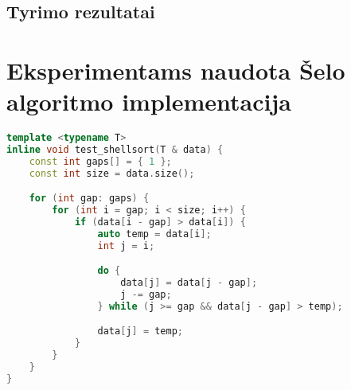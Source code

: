 \documentclass{VUMIFInfBakalaurinis}
\begin{document}
\subsection{Tyrimo rezultatai}




\printbibliography[heading=bibintoc]

\appendix  %

\section{Eksperimentams naudota Šelo algoritmo implementacija}

\begin{lstlisting}[label={alg:test_shellsort},language=C++]
template <typename T>
inline void test_shellsort(T & data) {
    const int gaps[] = { 1 };
    const int size = data.size();

    for (int gap: gaps) {
        for (int i = gap; i < size; i++) {
            if (data[i - gap] > data[i]) {
                auto temp = data[i];
                int j = i;

                do {
                    data[j] = data[j - gap];
                    j -= gap;
                } while (j >= gap && data[j - gap] > temp);

                data[j] = temp;
            }
        }
    }
}
\end{lstlisting}
\end{document}
